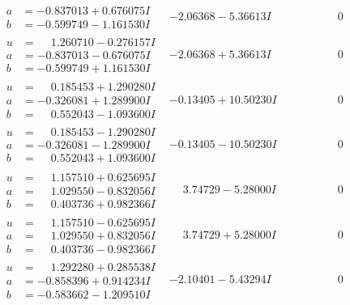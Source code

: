 \documentclass[1p]{elsarticle_modified}
\theoremstyle{definition}
\begin{document}
$$\begin{array}{c|c|c}
\begin{aligned}
a &= -0.837013 + 0.676075 I \\
b &= -0.599749 - 1.161530 I\end{aligned}
 & -2.06368 - 5.36613 I & \phantom{-0.000000 } 0 \\ \hline\begin{aligned}
u &= \phantom{-}1.260710 - 0.276157 I \\
a &= -0.837013 - 0.676075 I \\
b &= -0.599749 + 1.161530 I\end{aligned}
 & -2.06368 + 5.36613 I & \phantom{-0.000000 } 0 \\ \hline\begin{aligned}
u &= \phantom{-}0.185453 + 1.290280 I \\
a &= -0.326081 + 1.289900 I \\
b &= \phantom{-}0.552043 - 1.093600 I\end{aligned}
 & -0.13405 + 10.50230 I & \phantom{-0.000000 } 0 \\ \hline\begin{aligned}
u &= \phantom{-}0.185453 - 1.290280 I \\
a &= -0.326081 - 1.289900 I \\
b &= \phantom{-}0.552043 + 1.093600 I\end{aligned}
 & -0.13405 - 10.50230 I & \phantom{-0.000000 } 0 \\ \hline\begin{aligned}
u &= \phantom{-}1.157510 + 0.625695 I \\
a &= \phantom{-}1.029550 - 0.832056 I \\
b &= \phantom{-}0.403736 + 0.982366 I\end{aligned}
 & \phantom{-}3.74729 - 5.28000 I & \phantom{-0.000000 } 0 \\ \hline\begin{aligned}
u &= \phantom{-}1.157510 - 0.625695 I \\
a &= \phantom{-}1.029550 + 0.832056 I \\
b &= \phantom{-}0.403736 - 0.982366 I\end{aligned}
 & \phantom{-}3.74729 + 5.28000 I & \phantom{-0.000000 } 0 \\ \hline\begin{aligned}
u &= \phantom{-}1.292280 + 0.285538 I \\
a &= -0.858396 + 0.914234 I \\
b &= -0.583662 - 1.209510 I\end{aligned}
 & -2.10401 - 5.43294 I & \phantom{-0.000000 } 0 \\ \hline\begin{aligned}

\end{aligned}
\end{array}$$
\end{document}
